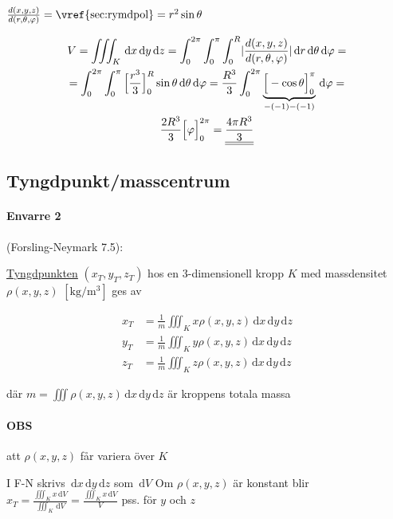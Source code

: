 \documentclass[a4paper]{article}
\newcommand{\svar}[1]{\underline{\underline{#1}}}
\DeclarePairedDelimiter \abs{\lvert}{\rvert}
\begin{document}
$\frac{d(x,y,z)}{d(r,\theta,\varphi)} = \text{\vref{sec:rymdpol}} = r^2\sin{\theta}$

\begin{gather*}
 	V = \iiint_K \,\mathrm{d}x\,\mathrm{d}y\,\mathrm{d}z =
 	\int_0^{2\pi}\int_0^\pi\int_0^R \abs{\frac{d(x,y,z)}{d(r,\theta,\varphi)}} \,\mathrm{d}r\,\mathrm{d}\theta\,\mathrm{d}\varphi = \\
 	= \int_0^{2\pi}\int_0^\pi \Big[ \frac{r^3}{3} \Big]_0^R \sin{\theta} \,\mathrm{d}\theta\,\mathrm{d}\varphi =
 	\frac{R^3}{3} \int_0^{2\pi} \underbrace{\Big[ -\cos{\theta} \Big]_0^\pi}_{-(-1)-(-1)} \,\mathrm{d}\varphi =  \\
 	\frac{2R^3}{3} \Big[ \varphi \Big]_0^{2\pi} =
 	\svar{\frac{4\pi R^3}{3}}
\end{gather*}

\newpage
\subsection{Tyngdpunkt/masscentrum}
\paragraph{Envarre 2} (Forsling-Neymark 7.5): \newline

\underline{Tyngdpunkten} $(x_T,y_T,z_T)$ hos en 3-dimensionell kropp $K$ med massdensitet $\rho(x,y,z)$ $\left[\si{\kilogram\per\metre^3}\right]$ ges av

\begin{align*}
	x_T &= \frac{1}{m} \iiint_K x\rho(x,y,z) \,\mathrm{d}x\,\mathrm{d}y\,\mathrm{d}z \\
	y_T &= \frac{1}{m} \iiint_K y\rho(x,y,z) \,\mathrm{d}x\,\mathrm{d}y\,\mathrm{d}z \\
	z_T &= \frac{1}{m} \iiint_K z\rho(x,y,z) \,\mathrm{d}x\,\mathrm{d}y\,\mathrm{d}z
\end{align*}

där $m=\iiint\rho(x,y,z) \,\mathrm{d}x\,\mathrm{d}y\,\mathrm{d}z$ är kroppens totala massa

\paragraph{OBS} att $\rho(x,y,z)$ får variera över $K$

I F-N skrivs $\,\mathrm{d}x\,\mathrm{d}y\,\mathrm{d}z$ som $\,\mathrm{d}V$ \newline
Om $\rho(x,y,z)$ är konstant blir $x_T = \frac{\iiint_K x\,\mathrm{d}V}{\iiint_K\,\mathrm{d}V} = \frac{\iiint_K x\,\mathrm{d}V}{V}$ pss. för $y$ och $z$ \newline
\end{document}
